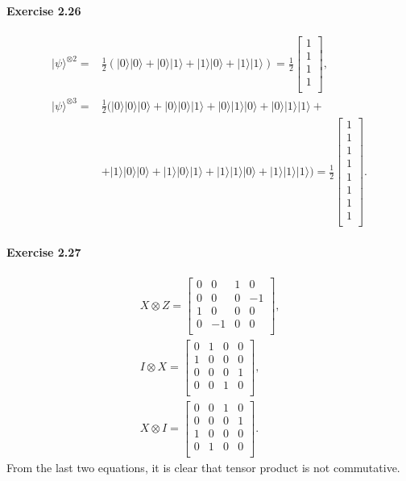\documentclass[a4paper,12pt]{article}
\newcommand{\exercise}[1]{\paragraph{Exercise #1}}
\newcommand{\ra}{\rangle}
\begin{document}
    \exercise{2.26}
    \begin{align}
        \nonumber
        | \psi \ra ^ {\otimes 2} = & \frac{1}{2}( | 0 \ra | 0 \ra + | 0 \ra | 1 \ra + | 1 \ra | 0 \ra + | 1 \ra | 1 \ra ) =
        \frac{1}{2}
        \begin{bmatrix}
            1\\
            1\\
            1\\
            1\\
        \end{bmatrix} \textrm{,}\\
        \nonumber
        | \psi \ra ^ {\otimes 3} = & \frac{1}{2}(
        | 0 \ra | 0 \ra | 0 \ra + | 0 \ra | 0 \ra | 1 \ra + | 0 \ra | 1 \ra | 0 \ra + | 0 \ra | 1 \ra | 1 \ra + \\
        & + | 1 \ra | 0 \ra | 0 \ra + | 1 \ra | 0 \ra | 1 \ra + | 1 \ra | 1 \ra | 0 \ra + | 1 \ra | 1 \ra | 1 \ra
        ) =
        \frac{1}{2}
        \begin{bmatrix}
            1\\
            1\\
            1\\
            1\\
            1\\
            1\\
            1\\
            1\\
        \end{bmatrix} \textrm{.}
    \end{align}

    \exercise{2.27}
    \begin{gather}
        \nonumber
        X \otimes Z =
        \begin{bmatrix}
            0 & 0 & 1 & 0\\
            0 & 0 & 0 & -1\\
            1 & 0 & 0 & 0\\
            0 & -1 & 0 & 0\\
        \end{bmatrix} \textrm{,}\\
        \nonumber
        I \otimes X =
        \begin{bmatrix}
            0 & 1 & 0 & 0\\
            1 & 0 & 0 & 0\\
            0 & 0 & 0 & 1\\
            0 & 0 & 1 & 0\\
        \end{bmatrix} \textrm{,}\\
        X \otimes I =
        \begin{bmatrix}
            0 & 0 & 1 & 0\\
            0 & 0 & 0 & 1\\
            1 & 0 & 0 & 0\\
            0 & 1 & 0 & 0\\
        \end{bmatrix} \textrm{.}
    \end{gather}
    From the last two equations, it is clear that tensor product is not commutative.
\end{document}
